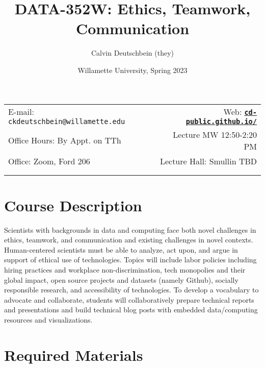 \documentclass[11pt]{article}
\title{DATA-352W: Ethics, Teamwork, Communication}
\author{Calvin Deutschbein (they)}
\date{Willamette University, Spring 2023}
\newcommand{\blankline}{\quad\pagebreak[2]}
\begin{document}
\maketitle

\blankline

\begin{tabular*}{.93\textwidth}{@{\extracolsep{\fill}}lr}


E-mail: \texttt{ckdeutschbein@willamette.edu} & Web: \href{https://cd-public.github.io/courses/intro/151s22.html}{\tt\bf cd-public.github.io/}  \\

 Office Hours: By Appt. on TTh  &  Lecture MW 12:50-2:20 PM \\

 Office: Zoom, Ford 206 & Lecture Hall: Smullin TBD\\
 & \\
&  \\
\hline
\end{tabular*}

\vspace{5 mm}


\section*{Course Description}

Scientists with backgrounds in data and computing face both novel challenges in ethics, teamwork, and communication and existing challenges in novel contexts. Human-centered scientists must be able to analyze, act upon, and argue in support of ethical use of technologies. Topics will include labor policies including hiring practices and workplace non-discrimination, tech monopolies and their global impact, open source projects and datasets (namely Github), socially responsible research, and accessibility of technologies. To develop a vocabulary to advocate and collaborate, students will collaboratively prepare technical reports and presentations and build technical blog posts with embedded data/computing resources and visualizations. 


\section*{Required Materials}
\end{document}

